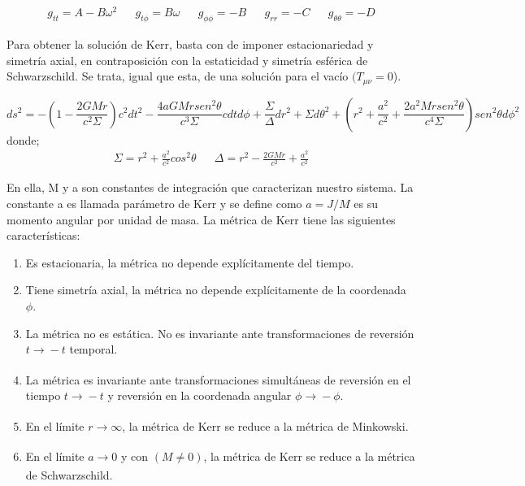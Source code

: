 \documentclass{article}
\begin{document}
\begin{align*}
   g_{tt}=A-B\omega^{2} && g_{t\phi}=B\omega && g_{\phi\phi}=-B && g_{rr}=-C && g_{\theta\theta}=-D
\end{align*}

Para obtener la solución de Kerr, basta con de imponer estacionariedad y simetría axial, en contraposición con la estaticidad y simetría esférica de Schwarzschild. Se trata, igual que esta, de una solución para el vacío $(T_{\mu\nu} = 0$).\cite{jeffersonagujeros} 

\begin{equation}\label{Kerr}
    ds^{2}=
    -\left(1-\frac{2GMr}{c^{2}\Sigma}\right)c^{2}dt^{2} 
    -\frac{4aGMrsen^{2}\theta}{c^{3}\Sigma}cdtd\phi 
    +\frac{\Sigma}{\Delta}dr^{2}
    +\Sigma d\theta^{2} 
    +\left(r^{2}+\frac{a^{2}}{c^{2}}+\frac{2a^{2}Mrsen^{2}\theta}{c^{4}\Sigma}\right)sen^{2}\theta d\phi^{2}
\end{equation}
donde;
\begin{align}
  \Sigma=r^{2}+\frac{a^{2}}{c^{2}}cos^{2}\theta  && \Delta=r^{2}-\frac{2GMr}{c^{2}}+\frac{a^{2}}{c^{2}}
\end{align}

En ella, M y a son constantes de integración que caracterizan nuestro sistema. La constante a es llamada parámetro de Kerr y se define como $a=J/M$ es su momento angular por unidad de masa. La métrica de Kerr tiene las siguientes características:\cite{jeffersonagujeros} 

\begin{enumerate}
    \item Es estacionaria, la métrica no depende explícitamente del tiempo.
    \item Tiene simetría axial, la métrica no depende explícitamente de la coordenada $\phi$.
    \item La métrica no es estática. No es invariante ante transformaciones de reversión $t \xrightarrow[]{} -t$ temporal.
    \item La métrica es invariante ante transformaciones simultáneas de reversión en el tiempo $t \xrightarrow[]{} -t$ y reversión en la coordenada angular $\phi \xrightarrow[]{} -\phi$.
    \item En el límite $r \xrightarrow[]{} \infty$, la métrica de Kerr se reduce a la métrica de Minkowski.
    \item En el límite $a \xrightarrow[]{} 0$ y con $(M \neq 0)$, la métrica de Kerr se reduce a la métrica de Schwarzschild.
\end{enumerate}
\end{document}
